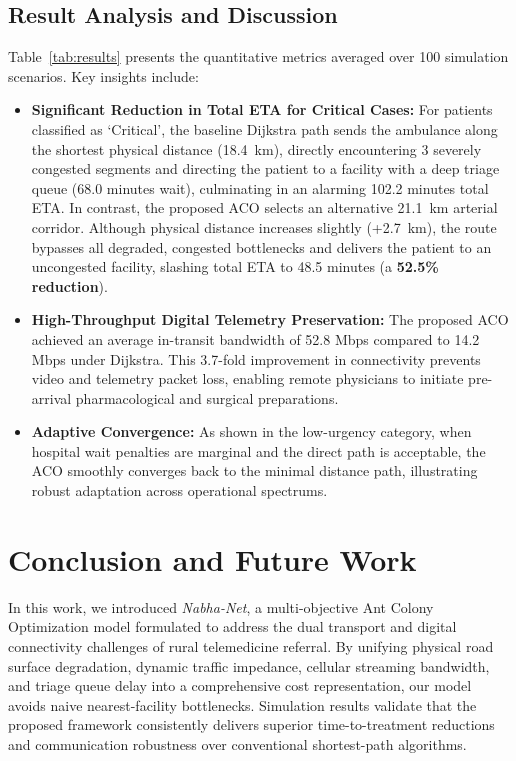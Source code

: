 \documentclass[conference]{IEEEtran}
\begin{document}
\subsection{Result Analysis and Discussion}
Table~\ref{tab:results} presents the quantitative metrics averaged over 100 simulation scenarios. Key insights include:
\begin{itemize}
    \item \textbf{Significant Reduction in Total ETA for Critical Cases:} For patients classified as `Critical', the baseline Dijkstra path sends the ambulance along the shortest physical distance (18.4~km), directly encountering 3 severely congested segments and directing the patient to a facility with a deep triage queue (68.0 minutes wait), culminating in an alarming 102.2 minutes total ETA. In contrast, the proposed ACO selects an alternative 21.1~km arterial corridor. Although physical distance increases slightly (+2.7~km), the route bypasses all degraded, congested bottlenecks and delivers the patient to an uncongested facility, slashing total ETA to 48.5 minutes (a \textbf{52.5\% reduction}).
    \item \textbf{High-Throughput Digital Telemetry Preservation:} The proposed ACO achieved an average in-transit bandwidth of 52.8 Mbps compared to 14.2 Mbps under Dijkstra. This 3.7-fold improvement in connectivity prevents video and telemetry packet loss, enabling remote physicians to initiate pre-arrival pharmacological and surgical preparations.
    \item \textbf{Adaptive Convergence:} As shown in the low-urgency category, when hospital wait penalties are marginal and the direct path is acceptable, the ACO smoothly converges back to the minimal distance path, illustrating robust adaptation across operational spectrums.
\end{itemize}

\section{Conclusion and Future Work}
In this work, we introduced \textit{Nabha-Net}, a multi-objective Ant Colony Optimization model formulated to address the dual transport and digital connectivity challenges of rural telemedicine referral. By unifying physical road surface degradation, dynamic traffic impedance, cellular streaming bandwidth, and triage queue delay into a comprehensive cost representation, our model avoids naive nearest-facility bottlenecks. Simulation results validate that the proposed framework consistently delivers superior time-to-treatment reductions and communication robustness over conventional shortest-path algorithms.
\end{document}
